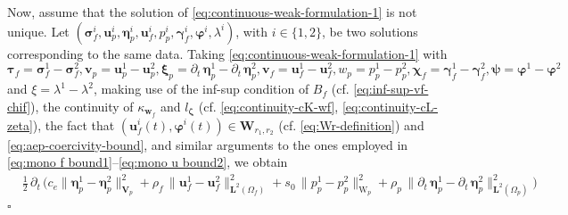 \documentclass[11pt]{article}
\numberwithin{equation}{section}
\newcommand{\ds}{\displaystyle}
\newcommand{\bgamma}{{\boldsymbol\gamma}}
\newcommand{\bLambda}{{\boldsymbol\Lambda}}
\newcommand{\bbeta}{{\boldsymbol\eta}}
\newcommand{\bsi}{{\boldsymbol\sigma}}
\newcommand{\bvarphi}{{\boldsymbol\varphi}}
\newcommand{\bpsi}{{\boldsymbol\psi}}
\newcommand{\btau}{{\boldsymbol\tau}}
\newcommand{\bzeta}{{\boldsymbol\zeta}}
\newcommand{\bchi}{{\boldsymbol\chi}}
\newcommand{\bxi}{{\boldsymbol\xi}}
\newcommand{\bv}{{\mathbf{v}}}
\newcommand{\bw}{{\mathbf{w}}}
\newcommand{\bu}{\mathbf{u}}
\newcommand{\bt}{{\mathbf{t}}}
\newcommand{\0}{{\mathbf{0}}}
\def\bV{\mathbf{V}}
\def\bW{\mathbf{W}}
\newcommand{\bL}{\mathbf{L}}
\newcommand\bbL{\mathbb{L}}
\newcommand{\cL}{\mathcal{L}}
\def\L{\mathrm{L}}
\def\W{\mathrm{W}}
\def\rd{\mathrm{d}}
\newenvironment{proof}{\noindent{\it Proof.}}{\hfill$\square$}
\numberwithin{equation}{section}
\begin{document}
\begin{proof}
Now, assume that the solution of \eqref{eq:continuous-weak-formulation-1} is not unique.
Let $(\bsi^i_f, \bu^i_p, \bbeta^i_p, \bu^i_f, p^i_p, \bgamma^i_f, \bvarphi^i, \lambda^i)$, with $i\in \{1,2\}$, be two solutions corresponding to the same data. Taking \eqref{eq:continuous-weak-formulation-1} with $\btau_f = \bsi^1_f - \bsi^2_f, \bv_p = \bu^1_p - \bu^2_p, \bxi_p = \partial_t\,\bbeta^1_p - \partial_t\,\bbeta^2_p, \bv_f = \bu^1_f - \bu^2_f, w_p = p^1_p - p^2_p, \bchi_f = \bgamma^1_f - \bgamma^2_f, \bpsi = \bvarphi^1 - \bvarphi^2$ and $\xi = \lambda^1 - \lambda^2$, making use of the inf-sup condition of $B_f$ (cf. \eqref{eq:inf-sup-vf-chif}), the continuity of  $\kappa_{\bw_f}$ and $l_{\bzeta}$ (cf. \eqref{eq:continuity-cK-wf}, \eqref{eq:continuity-cL-zeta}), the fact that $(\bu^i_f(t),\bvarphi^i(t))\in \bW_{r_1,r_2}$ (cf. \eqref{eq:Wr-definition}) and \eqref{eq:aep-coercivity-bound}, 
and similar arguments to the ones employed in \eqref{eq:mono f bound1}--\eqref{eq:mono u bound2}, we obtain
\begin{align}
&\frac{1}{2}\,\partial_t\,\Big( c_e\|\bbeta^1_p - \bbeta^2_p\|^2_{\bV_p}  + \rho_f\,\|\bu^1_f - \bu^2_f\|^2_{\bL^2(\Omega_f)} + s_0\,\|p^1_p - p^2_p\|^2_{\W_p} +\rho_p\,\|\partial_t\,\bbeta^1_p - \partial_t\,\bbeta^2_p\|^2_{\bL^2(\Omega_p)}\Big)  \nonumber\\ 

\end{align}
\end{proof}
\end{document}
